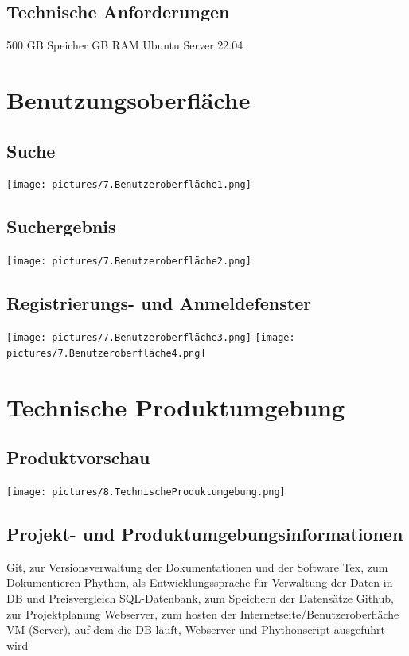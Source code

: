 \subsection{Technische Anforderungen}
500 GB Speicher  GB RAM \newline
Ubuntu Server 22.04 \newline

\section{Benutzungsoberfläche}
\subsection{Suche}
\texttt{[image: pictures/7.Benutzeroberfläche1.png]} 
\subsection{Suchergebnis}
\texttt{[image: pictures/7.Benutzeroberfläche2.png]} \newline \newline
\subsection{Registrierungs- und Anmeldefenster}
\texttt{[image: pictures/7.Benutzeroberfläche3.png]}
\texttt{[image: pictures/7.Benutzeroberfläche4.png]}

\section{Technische Produktumgebung}
\subsection{Produktvorschau}
\texttt{[image: pictures/8.TechnischeProduktumgebung.png]}

\subsection{Projekt- und Produktumgebungsinformationen}
Git, zur Versionsverwaltung der Dokumentationen und der Software \newline
Tex, zum Dokumentieren \newline
Phython, als Entwicklungssprache für Verwaltung der Daten in DB und Preisvergleich \newline
SQL-Datenbank, zum Speichern der Datensätze \newline
Github, zur Projektplanung \newline
Webserver, zum hosten der Internetseite/Benutzeroberfläche \newline
VM (Server), auf dem die DB läuft, Webserver und Phythonscript ausgeführt wird \newline

